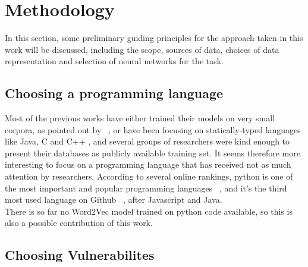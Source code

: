 \documentclass[
	a4paper,
	pagesize,
	pdftex,
	12pt,
	twoside, %
	BCOR=5mm, %
	ngerman,
	fleqn,
	final,
	]{scrartcl}
\begin{document}


\section{Methodology}\label{Methodology}
In this section, some preliminary guiding principles for the approach taken in this work will be discussed, including the scope, sources of data, choices of data representation and selection of neural networks for the task. 

\subsection{Choosing a programming language}
Most of the previous works have either trained their models on very small corpora, as pointed out by ~\cite{Bhoopchand.2016}, or have been focusing on statically-typed languages like Java, C and C++ \cite{Bellon.2007,Russell.2018,Liu.2018,Dam.2017, Rolim.2018}, and several groups of researchers were kind enough to present their databases as publicly available training set. It seems therefore more interesting to focus on a programming language that has received not as much attention by researchers. According to several online rankings, python is one of the most important and popular programming languages ~\cite{AyeshaCuthbert.15.4.2019, VidushiDwivedi.}, and it's the third most used language on Github ~\cite{Github.com.19}, after Javascript and Java.\\
There is so far no Word2Vec model trained on python code available, so this is also a possible contribution of this work.\\

\subsection{Choosing Vulnerabilites}
\end{document}
